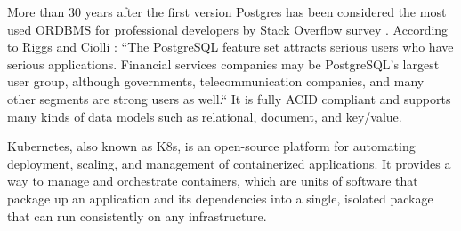 More than 30 years after the first version Postgres has been considered the most used ORDBMS for professional developers by Stack Overflow survey \cite{so2022survey}. According to Riggs and Ciolli \cite{Riggs2022}: “The PostgreSQL feature set attracts serious users who have serious applications. Financial services companies may be PostgreSQL's largest user group, although governments, telecommunication companies, and many other segments are strong users as well.“ It is fully ACID compliant \cite{juba2015learning} and supports many kinds of data models such as relational, document, and key/value. \cite{Riggs2022}


Kubernetes, also known as K8s, is an open-source platform for automating deployment, scaling, and management of containerized applications. It provides a way to manage and orchestrate containers, which are units of software that package up an application and its dependencies into a single, isolated package that can run consistently on any infrastructure. \cite{vayghan2019kubernetes}

